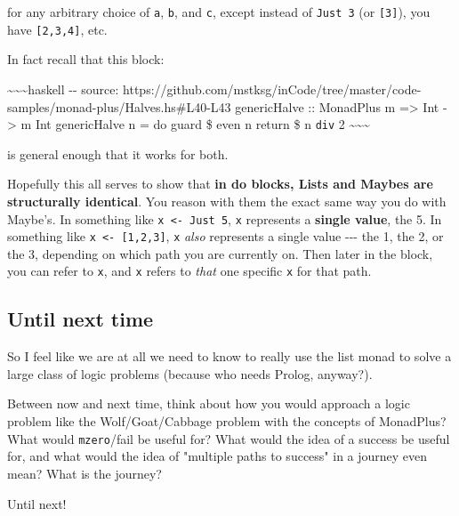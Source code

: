 \documentclass[]{article}
\begin{document}
for any arbitrary choice of \texttt{a}, \texttt{b}, and \texttt{c}, except
instead of \texttt{Just\ 3} (or \texttt{{[}3{]}}), you have
\texttt{{[}2,3,4{]}}, etc.

In fact recall that this block:

\textasciitilde{}\textasciitilde{}\textasciitilde{}haskell -\/- source:
https://github.com/mstksg/inCode/tree/master/code-samples/monad-plus/Halves.hs\#L40-L43
genericHalve :: MonadPlus m =\textgreater{} Int -\textgreater{} m Int
genericHalve n = do guard \$ even n return \$ n \texttt{div} 2
\textasciitilde{}\textasciitilde{}\textasciitilde{}

is general enough that it works for both.

Hopefully this all serves to show that \textbf{in do blocks, Lists and Maybes
are structurally identical}. You reason with them the exact same way you do with
Maybe's. In something like \texttt{x\ \textless{}-\ Just\ 5}, \texttt{x}
represents a \textbf{single value}, the 5. In something like
\texttt{x\ \textless{}-\ {[}1,2,3{]}}, \texttt{x} \emph{also} represents a
single value -\/-\/- the 1, the 2, or the 3, depending on which path you are
currently on. Then later in the block, you can refer to \texttt{x}, and
\texttt{x} refers to \emph{that} one specific \texttt{x} for that path.

\subsection{Until next time}

So I feel like we are at all we need to know to really use the list monad to
solve a large class of logic problems (because who needs Prolog, anyway?).

Between now and next time, think about how you would approach a logic problem
like the Wolf/Goat/Cabbage problem with the concepts of MonadPlus? What would
\texttt{mzero}/fail be useful for? What would the idea of a success be useful
for, and what would the idea of "multiple paths to success" in a journey even
mean? What is the journey?

Until next!
\end{document}
